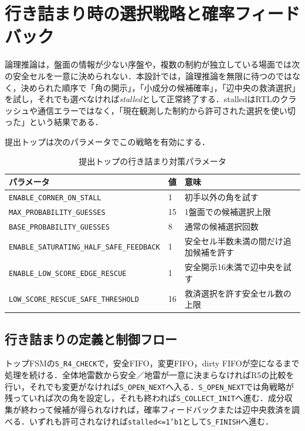 \chapter{行き詰まり時の選択戦略と確率フィードバック}
\label{ch:stall-strategy}

論理推論は，盤面の情報が少ない序盤や，複数の制約が独立している場面では次の安全セルを一意に決められない．本設計では，論理推論を無限に待つのではなく，決められた順序で「角の開示」，「小成分の候補確率」，「辺中央の救済選択」を試し，それでも選べなければ\emph{stalled}として正常終了する．stalledはRTLのクラッシュや通信エラーではなく，「現在観測した制約から許可された選択を使い切った」という結果である．

提出トップは次のパラメータでこの戦略を有効にする．

\begin{table}[tb]
\centering
\caption{提出トップの行き詰まり対策パラメータ}
\label{tab:stall-parameters}
\begin{tabular}{lll}
\toprule
パラメータ & 値 & 意味\\
\midrule
\texttt{ENABLE\_CORNER\_ON\_STALL} & 1 & 初手以外の角を試す\\
\texttt{MAX\_PROBABILITY\_GUESSES} & 15 & 1盤面での候補選択上限\\
\texttt{BASE\_PROBABILITY\_GUESSES} & 8 & 通常の候補選択回数\\
\texttt{ENABLE\_SATURATING\_HALF\_SAFE\_FEEDBACK} & 1 & 安全セル半数未満の間だけ追加候補を許す\\
\texttt{ENABLE\_LOW\_SCORE\_EDGE\_RESCUE} & 1 & 安全開示16未満で辺中央を試す\\
\texttt{LOW\_SCORE\_RESCUE\_SAFE\_THRESHOLD} & 16 & 救済選択を許す安全セル数の上限\\
\bottomrule
\end{tabular}
\end{table}

\section{行き詰まりの定義と制御フロー}
\label{sec:stall-definition}

トップFSMの\texttt{S\_R4\_CHECK}で，安全FIFO，変更FIFO，dirty FIFOが空になるまで処理を続ける．全体地雷数から安全／地雷が一意に決まらなければR5の比較を行い，それでも変更がなければ\texttt{S\_OPEN\_NEXT}へ入る．\texttt{S\_OPEN\_NEXT}では角戦略が残っていれば次の角を設定し，それも終われば\texttt{S\_COLLECT\_INIT}へ進む．成分収集が終わって候補が得られなければ，確率フィードバックまたは辺中央救済を調べる．いずれも許可されなければ\texttt{stalled<=1'b1}として\texttt{S\_FINISH}へ進む．

